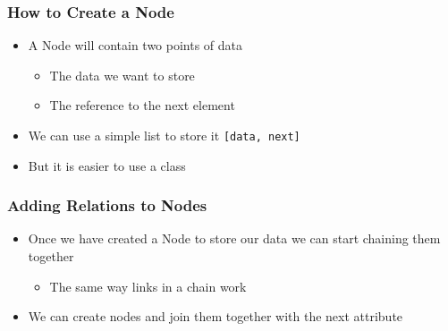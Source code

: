 \documentclass[11pt]{beamer}
\begin{document}
	\begin{frame}[fragile]
		\frametitle{How to Create a Node}
		\begin{itemize}
			\item A Node will contain two points of data
			\begin{itemize}
				\item The data we want to store
				\item The reference to the next element
			\end{itemize}
			\item We can use a simple list to store it \lstinline|[data, next]|
			\item But it is easier to use a class
		\end{itemize}
	\end{frame}

	\begin{frame}[fragile]
		\frametitle{Adding Relations to Nodes}
		\begin{itemize}
			\item Once we have created a Node to store our data we can start chaining them together
			\begin{itemize}
				\item The same way links in a chain work
			\end{itemize}
			\item We can create nodes and join them together with the next attribute
		\end{itemize}
		\vspace{0.5cm}
  		\begin{center}
  		\end{center}
	\end{frame}
\end{document}
